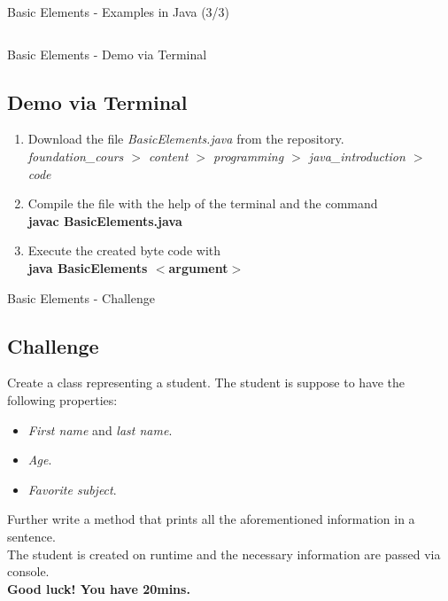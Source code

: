 \documentclass[11pt]{beamer}
\newcommand{\nologo}{\setbeamertemplate{logo}{}}
\begin{document}
	{\nologo
	\begin{frame}{Basic Elements - Examples in Java (3/3)}
		\ssmall \inputminted[firstline=38,lastline=59]{java}{code/BasicElements.java}
	\end{frame}
	}
	
	\begin{frame}{Basic Elements - Demo via Terminal}
		\subsection{Demo via Terminal}
		\begin{enumerate}
			\item{Download the file \textit{BasicElements.java} from the repository.\\ {\ssmall \textit{foundation\_cours $>$ content $>$ programming $>$ java\_introduction $>$ code}}}
			\item{Compile the file with the help of the terminal and the command\\ \textbf{javac BasicElements.java}}
			\item{Execute the created byte code with\\ \textbf{java BasicElements $<$argument$>$}}
		\end{enumerate}
	\end{frame}
	
	\begin{frame}{Basic Elements - Challenge}
		\subsection{Challenge}
		Create a class representing a student. The student is suppose to have the following properties:
		\begin{itemize}
			\item{\textit{First name} and \textit{last name}.}
			\item{\textit{Age}.}
			\item{\textit{Favorite subject}.}
		\end{itemize}
		
		Further write a method that prints all the aforementioned information in a sentence.\\
		
		The student is created on runtime and the necessary information are passed via console.\\

		\textbf{Good luck! You have 20mins.}
	\end{frame}
	
\end{document}
